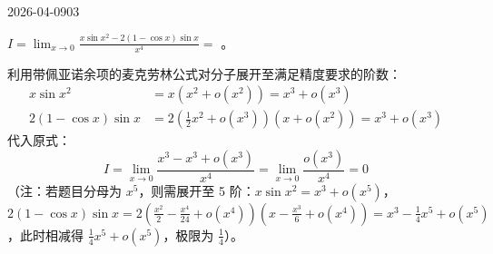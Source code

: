 \begin{mistake}{2026-04-09}{03}

\begin{problemcontent}
\( I = \lim_{x \to 0} \frac{x \sin x^2 - 2(1 - \cos x)\sin x}{x^4} = \) \underline{\hspace{2em}}。
\end{problemcontent}

\begin{solutioncontent}
利用带佩亚诺余项的麦克劳林公式对分子展开至满足精度要求的阶数：
\[
\begin{aligned}
x \sin x^2 &= x(x^2 + o(x^2)) = x^3 + o(x^3) \\
2(1 - \cos x)\sin x &= 2\left(\frac{1}{2}x^2 + o(x^3)\right)(x + o(x^2)) = x^3 + o(x^3)
\end{aligned}
\]
代入原式：
\[
I = \lim_{x \to 0} \frac{x^3 - x^3 + o(x^3)}{x^4} = \lim_{x \to 0} \frac{o(x^3)}{x^4} = 0
\]
（注：若题目分母为 \(x^5\)，则需展开至 5 阶：\(x\sin x^2 = x^3 + o(x^5)\)，\(2(1-\cos x)\sin x = 2(\frac{x^2}{2} - \frac{x^4}{24} + o(x^4))(x - \frac{x^3}{6} + o(x^4)) = x^3 - \frac{1}{4}x^5 + o(x^5)\)，此时相减得 \(\frac{1}{4}x^5 + o(x^5)\)，极限为 \(\frac{1}{4}\)）。
\end{solutioncontent}


\end{mistake}
